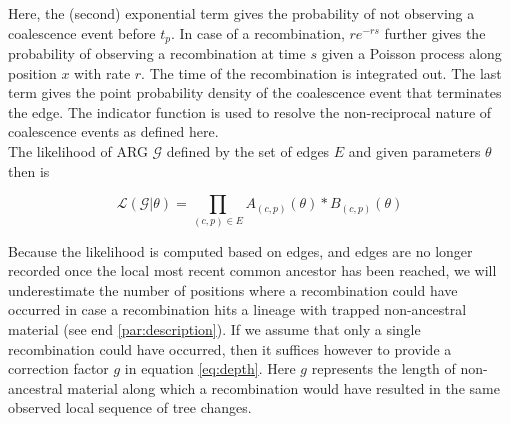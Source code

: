 \documentclass{article}
\begin{document}
Here, the (second) exponential term gives the probability of not observing a 
coalescence event before $t_p$. In case of a recombination, $re^{-rs}$ further 
gives the probability of observing a recombination 
at time $s$ given a Poisson process along position $x$ with rate $r$. The 
time of the recombination is integrated out.
The last term gives the point probability density of the coalescence event 
that terminates the edge. The indicator function is used to resolve 
the non-reciprocal nature of coalescence events as defined here.\\

The likelihood of ARG $\mathcal{G}$ defined by the set of edges $E$ and
given parameters $\theta$ then is

\begin{equation}\label{eq:full-lik}
\mathcal{L}(\mathcal{G}|\theta) = \prod_{(c, p) \in E} A_{(c, p)}(\theta) * B_{(c, p)}(\theta)
\end{equation}


Because the likelihood is computed based on edges,
and edges are no longer recorded once the local most recent common ancestor 
has been reached, we will underestimate the number of positions where 
a recombination could have occurred in case a recombination hits a 
lineage with trapped non-ancestral material (see end \ref{par:description}). 
If we assume that only a single recombination could have  
occurred, then it suffices however to provide a correction factor $g$ in equation
\ref{eq:depth}. Here $g$ represents the 
length of non-ancestral material along which a recombination would have resulted  
in the same observed local sequence of tree changes.
\end{document}

